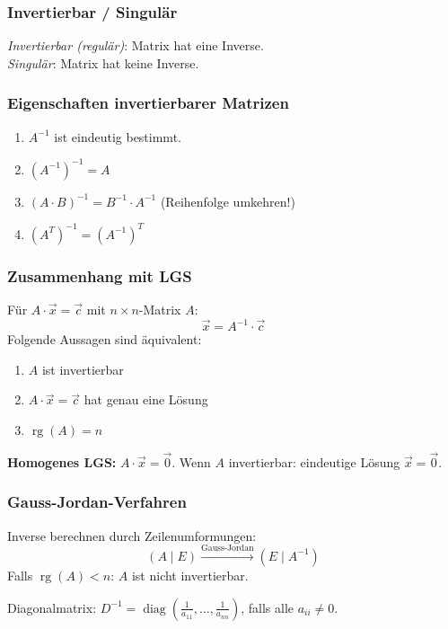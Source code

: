 \subsubsection{Invertierbar / Singulär}
\emph{Invertierbar (regulär)}: Matrix hat eine Inverse. \\
\emph{Singulär}: Matrix hat keine Inverse.

\subsubsection{Eigenschaften invertierbarer Matrizen}
\begin{enumerate}
    \item $A^{-1}$ ist eindeutig bestimmt.
    \item $(A^{-1})^{-1} = A$
    \item $(A \cdot B)^{-1} = B^{-1} \cdot A^{-1}$ \quad (Reihenfolge umkehren!)
    \item $(A^T)^{-1} = (A^{-1})^T$
\end{enumerate}
\subsubsection{Zusammenhang mit LGS}
Für $A \cdot \vec{x} = \vec{c}$ mit $n \times n$-Matrix $A$:
\[
    \vec{x} = A^{-1} \cdot \vec{c}
\]
Folgende Aussagen sind äquivalent:
\begin{enumerate}
    \item $A$ ist invertierbar
    \item $A \cdot \vec{x} = \vec{c}$ hat genau eine Lösung
    \item $\operatorname{rg}(A) = n$
\end{enumerate}

\textbf{Homogenes LGS:} $A \cdot \vec{x} = \vec{0}$. Wenn $A$ invertierbar: eindeutige Lösung $\vec{x} = \vec{0}$.

\subsubsection{Gauss-Jordan-Verfahren}
Inverse berechnen durch Zeilenumformungen:
\[
    \left( A \mid E \right) \xrightarrow{\text{Gauss-Jordan}} \left( E \mid A^{-1} \right)
\]
Falls $\operatorname{rg}(A) < n$: $A$ ist nicht invertierbar.

Diagonalmatrix: $D^{-1} = \operatorname{diag}\!\left(\frac{1}{a_{11}}, \ldots, \frac{1}{a_{nn}}\right)$, falls alle $a_{ii} \neq 0$.

